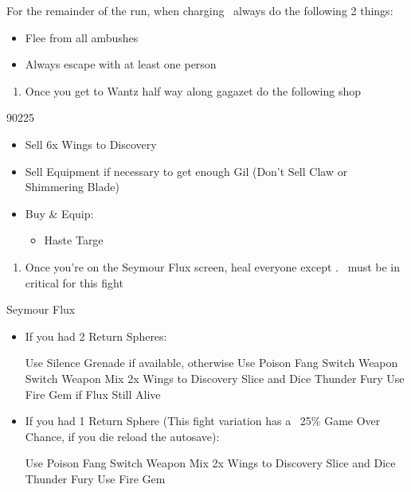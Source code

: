 \begin{encounters}
	For the remainder of the run, when charging \od\ always do the following 2 things:
	\begin{itemize}
		\item Flee from all ambushes
		\item Always escape with at least one person
	\end{itemize}
\end{encounters}
\begin{enumerate}[resume]
	\item Once you get to Wantz half way along gagazet do the following shop
\end{enumerate}
\begin{shop}{90225}
	\begin{itemize}
		\item Sell 6x Wings to Discovery
		\item Sell Equipment if necessary to get enough Gil (Don't Sell Claw or Shimmering Blade)
		\item Buy \& Equip:
		\begin{itemize}
			\item Haste Targe
		\end{itemize}
	\end{itemize}
\end{shop}
\begin{enumerate}[resume]
	\item Once you're on the Seymour Flux screen, heal everyone except \rikku. \rikku\ must be in critical for this fight
\end{enumerate}
\begin{battle}[70000]{Seymour Flux}
	\begin{itemize}
		\item If you had 2 Return Spheres:
			\begin{itemize}
				\rikkuf Use Silence Grenade if available, otherwise Use Poison Fang
				\tidusf Switch Weapon
				\luluf Switch Weapon
				\rikkuf Mix 2x Wings to Discovery
				\tidusf Slice and Dice
				\luluf Thunder Fury
				\rikkuf Use Fire Gem if Flux Still Alive
			\end{itemize}
		\item If you had 1 Return Sphere (This fight variation has a ~25\% Game Over Chance, if you die reload the autosave):
			\begin{itemize}
				\rikkuf Use Poison Fang
				\tidusf Switch Weapon
				\rikkuf Mix 2x Wings to Discovery
				\tidusf Slice and Dice
				\luluf Thunder Fury
				\rikkuf Use Fire Gem
			\end{itemize}
	\end{itemize}
\end{battle}
